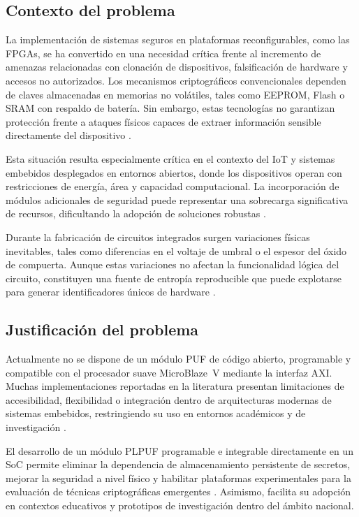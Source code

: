 \subsection{Contexto del problema}

La implementación de sistemas seguros en plataformas reconfigurables, como las FPGAs,
se ha convertido en una necesidad crítica frente al incremento de amenazas relacionadas
con clonación de dispositivos, falsificación de hardware y accesos no autorizados.
Los mecanismos criptográficos convencionales dependen de claves almacenadas en memorias
no volátiles, tales como EEPROM, Flash o SRAM con respaldo de batería. Sin embargo,
estas tecnologías no garantizan protección frente a ataques físicos capaces de extraer
información sensible directamente del dispositivo \cite{hou_2019_lightweight}.

Esta situación resulta especialmente crítica en el contexto del IoT y sistemas embebidos
desplegados en entornos abiertos, donde los dispositivos operan con restricciones de
energía, área y capacidad computacional. La incorporación de módulos adicionales de
seguridad puede representar una sobrecarga significativa de recursos, dificultando la
adopción de soluciones robustas \cite{shamsoshoara_2020_puf, alhamarneh_2024_strengthening}.

Durante la fabricación de circuitos integrados surgen variaciones físicas inevitables,
tales como diferencias en el voltaje de umbral o el espesor del óxido de compuerta.
Aunque estas variaciones no afectan la funcionalidad lógica del circuito, constituyen
una fuente de entropía reproducible que puede explotarse para generar
identificadores únicos de hardware \cite{sudhanya_2016_silicon}.

\subsection{Justificación del problema}

Actualmente no se dispone de un módulo PUF de código abierto, programable y compatible
con el procesador suave MicroBlaze~V mediante la interfaz AXI. Muchas implementaciones
reportadas en la literatura presentan limitaciones de accesibilidad, flexibilidad o
integración dentro de arquitecturas modernas de sistemas embebidos, restringiendo su uso
en entornos académicos y de investigación \cite{lata_2023_fpgapuf, anandakumar_2021_fpgapufs}.

El desarrollo de un módulo PLPUF programable e integrable directamente en un SoC permite
eliminar la dependencia de almacenamiento persistente de secretos, mejorar la seguridad
a nivel físico y habilitar plataformas experimentales para la evaluación de técnicas
criptográficas emergentes \cite{delvaux_2015_helper, farha_2019_physical}. Asimismo,
facilita su adopción en contextos educativos y prototipos de investigación dentro del
ámbito nacional.

